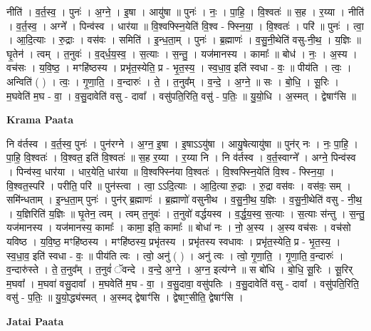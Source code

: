 \documentclass[17pt]{extarticle}
\begin{document}
नीति॑ । व॒र्त॒स्व॒ । पुनः॑ । अ॒ग्ने॒ । इ॒षा । आयु॑षा ॥ पुनः॑ । नः॒ । पा॒हि॒ । वि॒श्वतः॑ ॥ स॒ह । र॒य्या । नीति॑ । व॒र्त॒स्व॒ । अग्ने᳚ । पिन्व॑स्व । धार॑या ॥ वि॒श्वफ्स्नि॒येति॑ वि॒श्व - फ्स्नि॒या॒ । वि॒श्वतः॑ । परि॑ ॥ पुनः॑ । त्वा॒ । आ॒दि॒त्याः । रु॒द्राः । वस॑वः । समिति॑ । इ॒न्ध॒ता॒म् । पुनः॑ । ब्र॒ह्माणः॑ । व॒सु॒नी॒थेति॑ वसु-नी॒थ॒ । य॒ज्ञिः ॥ घृ॒तेन॑ । त्वम् । त॒नुवः॑ । व॒द्‌र्ध॒य॒स्व॒ । स॒त्याः । स॒न्तु॒ । यज॑मानस्य । कामाः᳚ ॥ बोध॑ । नः॒ । अ॒स्य । वच॑सः । य॒वि॒ष्ठ॒ । मꣳहि॑ष्ठस्य । प्रभृ॑त॒स्येति॒ प्र - भृ॒त॒स्य॒ । स्व॒धा॒व॒ इति॑ स्वधा - वः॒ ॥ पीय॑ति । त्वः॒ । अन्विति॑ ( ) । त्वः॒ । गृ॒णा॒ति॒ । व॒न्दारुः॑ । ते॒ । त॒नुव᳚म् । व॒न्दे॒ । अ॒ग्ने॒ ॥ सः । बो॒धि॒ । सू॒रिः । म॒घवेति॑ म॒घ - वा॒ । व॒सु॒दावेति॑ वसु - दावा᳚ । वसु॑पति॒रिति॒ वसु॑ - प॒तिः॒ ॥ यु॒यो॒धि । अ॒स्मत् । द्वेषाꣳ॑सि ॥  \newline


\textbf{Krama Paata} \newline

नि व॑र्तस्व । व॒र्त॒स्व॒ पुनः॑ । पुन॑रग्ने । अ॒ग्न॒ इ॒षा । इ॒षाऽऽयु॑षा । आयु॒षेत्यायु॑षा ॥ पुन॑र् नः । नः॒ पा॒हि॒ । पा॒हि॒ वि॒श्वतः॑ । वि॒श्वत॒ इति॑ वि॒श्वतः॑ ॥ स॒ह र॒य्या । र॒य्या नि । नि व॑र्तस्व । व॒र्त॒स्वाग्ने᳚ । अग्ने॒ पिन्व॑स्व । पिन्व॑स्व॒ धार॑या । धार॒येति॒ धार॑या ॥ वि॒श्वफ्स्नि॑या वि॒श्वतः॑ । वि॒श्वफ्स्नि॒येति॑ वि॒श्व - फ्स्नि॒या॒ । वि॒श्वत॒स्परि॑ । परीति॒ परि॑ ॥ पुन॑स्त्वा । त्वा॒ ऽऽदि॒त्याः । आ॒दि॒त्या रु॒द्राः । रु॒द्रा वस॑वः । वस॑वः॒ सम् । समि॑न्धताम् । इ॒न्ध॒ता॒म् पुनः॑ । पुन॑र् ब्र॒ह्माणः॑ । ब्र॒ह्माणो॑ वसुनीथ । व॒सु॒नी॒थ॒ य॒ज्ञिः । व॒सु॒नी॒थेति॑ वसु - नी॒थ॒ । य॒ज्ञिरिति॑ य॒ज्ञिः ॥ घृ॒तेन॒ त्वम् । त्वम् त॒नुवः॑ । त॒नुवो॑ वर्द्धयस्व । व॒र्द्ध॒य॒स्व॒ स॒त्याः । स॒त्याः स॑न्तु । स॒न्तु॒ यज॑मानस्य । यज॑मानस्य॒ कामाः᳚ । कामा॒ इति॒ कामाः᳚ ॥ बोधा॑ नः । नो॒ अ॒स्य । अ॒स्य वच॑सः । वच॑सो यविष्ठ । य॒वि॒ष्ठ॒ मꣳहि॑ष्ठस्य । मꣳहि॑ष्ठस्य॒ प्रभृ॑तस्य । प्रभृ॑तस्य स्वधावः । प्रभृ॑त॒स्येति॒ प्र - भृ॒त॒स्य॒ । स्व॒धा॒व॒ इति॑ स्वधा - वः॒ ॥ पीय॑ति त्वः । त्वो॒ अनु॑ ( ) । अनु॑ त्वः । त्वो॒ गृ॒णा॒ति॒ । गृ॒णा॒ति॒ व॒न्दारुः॑ । व॒न्दारु॑स्ते । ते॒ त॒नुव᳚म् । त॒नुवं॑ ॅवन्दे । व॒न्दे॒ अ॒ग्ने॒ । अ॒ग्न॒ इत्य॑ग्ने ॥ स बो॑धि । बो॒धि॒ सू॒रिः । सू॒रिर् म॒घवा᳚ । म॒घवा॑ वसु॒दावा᳚ । म॒घवेति॑ म॒घ - वा॒ । व॒सु॒दावा॒ वसु॑पतिः । व॒सु॒दावेति॑ वसु - दावा᳚ । वसु॑पति॒रिति॒ वसु॑ - प॒तिः॒ ॥ यु॒यो॒द्ध्य॑स्मत् । अ॒स्मद् द्वेषाꣳ॑सि । द्वेषाꣳ॒॒सीति॒ द्वेषाꣳ॑सि । \newline

\textbf{Jatai Paata} \newline
\end{document}
